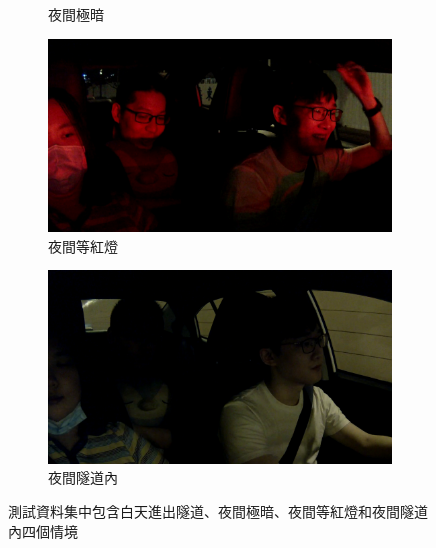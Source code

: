 \begin{figure}[t]
\begin{subfigure}[b]{0.22\textwidth}
    \caption {夜間極暗}
\end{subfigure}
\begin{subfigure}[b]{0.22\textwidth}
    \includegraphics[width=\textwidth]{figures/test_3_2}
    \caption {夜間等紅燈}
\end{subfigure}
\begin{subfigure}[b]{0.22\textwidth}
    \includegraphics[width=\textwidth]{figures/test_4_2}
    \caption {夜間隧道內}
\end{subfigure}
\caption[測試資料集中的圖片範例]{測試資料集中包含白天進出隧道、夜間極暗、夜間等紅燈和夜間隧道內四個情境}
\label{fig:test_data}
\end{figure}

